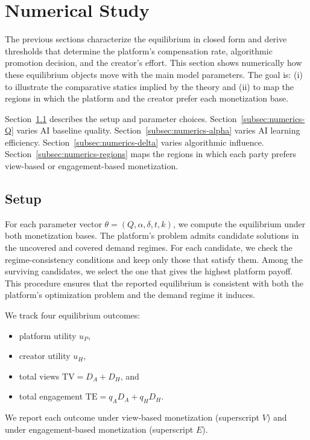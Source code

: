 \section{Numerical Study}\label{sec:numerical}

The previous sections characterize the equilibrium in closed form and
derive thresholds that determine the platform's compensation rate,
algorithmic promotion decision, and the creator's effort. This section
shows numerically how these equilibrium objects move with the main
model parameters. The goal is: (i) to illustrate the
comparative statics implied by the theory and (ii) to map the regions in
which the platform and the creator prefer each monetization base.

Section~\ref{subsec:numerics-design} describes the setup and parameter
choices. Section~\ref{subsec:numerics-Q} varies AI baseline quality.
Section~\ref{subsec:numerics-alpha} varies AI learning efficiency.
Section~\ref{subsec:numerics-delta} varies algorithmic influence.
Section~\ref{subsec:numerics-regions} maps the regions in which each
party prefers view-based or engagement-based monetization.

\subsection{Setup}
\label{subsec:numerics-design}

For each parameter vector $\theta=(Q,\alpha,\delta,t,k)$, we compute
the equilibrium under both monetization bases. The platform's problem
admits candidate solutions in the uncovered and covered demand
regimes. For each candidate, we check the regime-consistency
conditions and keep only those that satisfy them. Among the surviving
candidates, we select the one that gives the highest platform payoff.
This procedure ensures that the reported equilibrium is consistent
with both the platform's optimization problem and the demand regime
it induces.

We track four equilibrium outcomes:
\begin{itemize}
    \item platform utility $u_P$,
    \item creator utility $u_H$,
    \item total views $\mathrm{TV}=D_A+D_H$, and
    \item total engagement $\mathrm{TE}=q_A D_A+q_H D_H$.
\end{itemize}
We report each outcome under view-based monetization (superscript $V$)
and under engagement-based monetization (superscript $E$).

